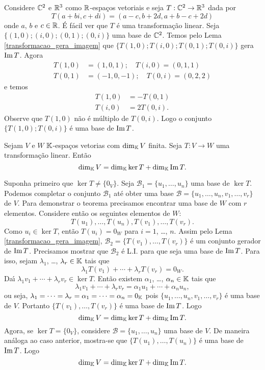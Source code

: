 \begin{exemplo}
	Considere $\mathbb{C}^2$ e $\mathbb{R}^3$ como $\mathbb{R}$-espa\c{c}os vetoriais e seja $T : \mathbb{C}^2 \to \mathbb{R}^3$ dada por
	\[
		T(a+bi, c+di) = (a - c, b + 2d, a + b - c + 2d)
	\]
	onde $a$, $b$ e $c \in \mathbb{R}$. \'E f\'acil ver que $T$ \'e uma transforma\c{c}\~ao linear. Seja $\{(1,0);(i,0);(0,1);(0,i)\}$ uma base de $\mathbb{C}^2$. Temos pelo Lema \ref{transformacao_gera_imagem} que $\{T(1,0);T(i,0);T(0,1);T(0,i)\}$ gera ${\rm Im\,} T$. Agora
	\begin{align*}
		T(1,0) &= (1,0,1);\quad T(i,0) = (0,1,1)\\
		T(0,1) &= (-1,0,-1);\quad T(0,i) = (0,2,2)
	\end{align*}
	e temos
	\begin{align*}
		T(1,0) &= -T(0,1)\\
		T(i,0) &= 2T(0,i).
	\end{align*}
	Observe que $T(1,0)$ n\~ao \'e m\'ultiplo de $T(0,i)$. Logo o conjunto $\{T(1,0); T(0,i)\}$ \'e uma base de ${\rm Im\,} T$.
\end{exemplo}

\begin{teorema}\label{teorema_do_nucleo_e_da_imagem}
	Sejam $V$ e $W$ $\mathbb{K}$-espa\c{c}os vetorias com $\dim_{\mathbb{K}}V$ finita. Seja $T : V \to W$ uma transforma\c{c}\~ao linear. Ent\~ao
	\[
		\dim_{\mathbb{K}}V = \dim_{\mathbb{K}}\ker T + \dim_{\mathbb{K}}{\rm Im\,} T.
	\]
\end{teorema}
\begin{prova}
	Suponha primeiro que $\ker T \ne \{0_V\}$. Seja $\mathcal{B}_1 = \{u_1, \dots, u_n\}$ uma base de $\ker T$. Podemos completar o conjunto $\mathcal{B}_1$ at\'e obter uma base $\mathcal{B} = \{u_1, \dots, u_n, v_1, \dots, v_r\}$ de $V$. Para demonstrar o teorema precisamos encontrar uma base de $W$ com $r$ elementos. Considere ent\~ao os seguintes elementos de $W$:
	\[
		T(u_1), \dots, T(u_n), T(v_1), \dots, T(v_r).
	\]
	Como $u_i \in \ker T$, ent\~ao $T(u_i) = 0_W$ para $i = 1$, \dots, $n$. Assim pelo Lema \ref{transformacao_gera_imagem}, $\mathcal{B}_2 = \{T(v_1), \dots, T(v_r)\}$ \'e um conjunto gerador de ${\rm Im\,} T$. Precisamos mostrar que $\mathcal{B}_2$ \'e L.I. para que seja uma base de ${\rm Im\,} T$. Para isso, sejam $\lambda_1$, \dots, $\lambda_r \in \mathbb{K}$ tais que
	\[
		\lambda_1T(v_1) + \cdots + \lambda_rT(v_r) = 0_W.
	\]
	Da{\'\i} $\lambda_1v_1 + \cdots + \lambda_rv_r \in \ker T$. Ent\~ao existem $\alpha_1$, \dots, $\alpha_n \in \mathbb{K}$ tais que
	\[
		\lambda_1v_1 + \cdots + \lambda_rv_r = \alpha_1u_1 + \cdots + \alpha_nu_n,
	\]
	ou seja, $\lambda_1 = \cdots = \lambda_r = \alpha_1 = \cdots = \alpha_n = 0_{\mathbb{K}}$ pois $\{u_1, \dots, u_n, v_1, \dots, v_r\}$ \'e uma base de $V$. Portanto $\{T(v_1), \dots, T(v_r)\}$ \'e uma base de ${\rm Im\,} T$. Logo
	\[
		\dim_{\mathbb{K}}V = \dim_{\mathbb{K}}\ker T + \dim_{\mathbb{K}}{\rm Im\,} T.
	\]
	Agora, se $\ker T = \{0_V\}$, considere $\mathcal{B} = \{u_1, \dots, u_n\}$ uma base de $V$. De maneira an\'aloga ao caso anterior, mostra-se que $\{T(u_1), \dots, T(u_n)\}$ \'e uma base de ${\rm Im\,} T$. Logo
	\[
		\dim_{\mathbb{K}}V = \dim_{\mathbb{K}}\ker T + \dim_{\mathbb{K}}{\rm Im\,} T.
	\]
\end{prova}

